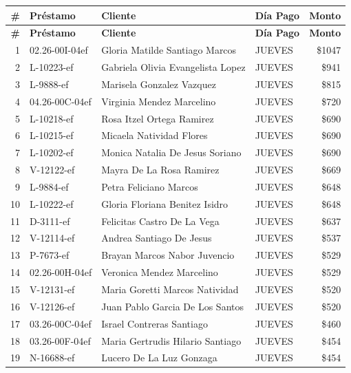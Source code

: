\documentclass[11pt,a4paper]{article}
\newcommand{\money}[1]{\$\num{#1}}
\begin{document}
\begin{center}
\renewcommand{\arraystretch}{1.1}
\footnotesize
\begin{longtable}{rlp{6.5cm}lr}
\toprule
\textbf{\#} & \textbf{Pr\'estamo} & \textbf{Cliente} & \textbf{D\'ia Pago} & \textbf{Monto} \\
\midrule
\endfirsthead
\toprule
\textbf{\#} & \textbf{Pr\'estamo} & \textbf{Cliente} & \textbf{D\'ia Pago} & \textbf{Monto} \\
\midrule
\endhead
1 & 02.26-00I-04ef & Gloria Matilde Santiago Marcos & JUEVES & \money{1047} \\
2 & L-10223-ef & Gabriela Olivia Evangelista Lopez & JUEVES & \money{941} \\
3 & L-9888-ef & Marisela Gonzalez Vazquez & JUEVES & \money{815} \\
4 & 04.26-00C-04ef & Virginia Mendez Marcelino & JUEVES & \money{720} \\
5 & L-10218-ef & Rosa Itzel Ortega Ramirez & JUEVES & \money{690} \\
6 & L-10215-ef & Micaela Natividad Flores & JUEVES & \money{690} \\
7 & L-10202-ef & Monica Natalia De Jesus Soriano & JUEVES & \money{690} \\
8 & V-12122-ef & Mayra De La Rosa Ramirez & JUEVES & \money{669} \\
9 & L-9884-ef & Petra Feliciano Marcos & JUEVES & \money{648} \\
10 & L-10222-ef & Gloria Floriana Benitez Isidro & JUEVES & \money{648} \\
11 & D-3111-ef & Felicitas Castro De La Vega & JUEVES & \money{637} \\
12 & V-12114-ef & Andrea Santiago De Jesus & JUEVES & \money{537} \\
13 & P-7673-ef & Brayan Marcos Nabor Juvencio & JUEVES & \money{529} \\
14 & 02.26-00H-04ef & Veronica Mendez Marcelino & JUEVES & \money{529} \\
15 & V-12131-ef & Maria Goretti Marcos Natividad & JUEVES & \money{520} \\
16 & V-12126-ef & Juan Pablo Garcia De Los Santos & JUEVES & \money{520} \\
17 & 03.26-00C-04ef & Israel Contreras Santiago & JUEVES & \money{460} \\
18 & 03.26-00F-04ef & Maria Gertrudis Hilario Santiago & JUEVES & \money{454} \\
19 & N-16688-ef & Lucero De La Luz Gonzaga & JUEVES & \money{454} \\

\end{longtable}
\end{center}
\end{document}
